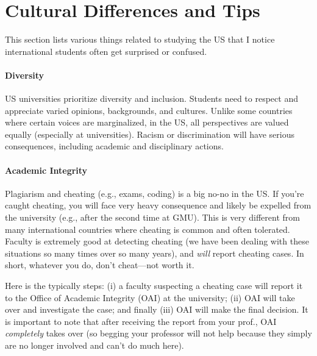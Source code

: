 \documentclass[11pt]{article}
\newcommand{\mycomment}[3][\color{blue}]{{#1{{#2}: {#3}}}}
\newcommand{\tvn}[1]{\mycomment{TVN}{#1}}{}
\begin{document}


\section{Cultural Differences and Tips}\label{sec:cultural}

This section lists various things related to studying the US that I notice international students often get surprised or confused.


\paragraph{Diversity} US universities prioritize diversity and inclusion. Students need to respect and appreciate varied opinions, backgrounds, and cultures. Unlike some countries where certain voices are marginalized, in the US, all perspectives are valued equally (especially at universities). Racism or discrimination will have serious consequences, including academic and disciplinary actions.


\paragraph{Academic Integrity} Plagiarism and cheating (e.g., exams, coding) is a big no-no in the US.  If you're caught cheating, you will face very heavy consequence and likely be expelled from the university (e.g., after the second time at GMU).   This is very different from many international countries where cheating is common and often tolerated.  Faculty is extremely good at detecting cheating (we have been dealing with these situations so many times over so many years), and \emph{will} report cheating cases.  In short, whatever you do, don't cheat---not worth it.

Here is the typically steps: (i) a faculty suspecting a cheating case will report it to the Office of Academic Integrity (OAI) at the university;  (ii)  OAI will take over and investigate the case; and finally (iii) OAI will make the final decision.  It is important to note that after receiving the report from your prof., OAI \emph{completely} takes over (so begging your professor will not help because they simply are no longer involved and can't do much here).
    
\end{document}
